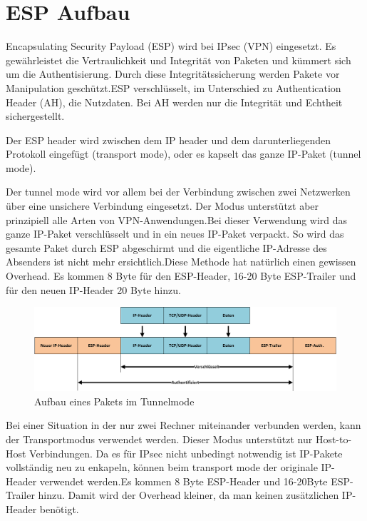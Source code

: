 \section{ESP Aufbau}
\label{sec:ESP Aufbau}

\noindent Encapsulating Security Payload (ESP) wird bei IPsec (VPN) eingesetzt. Es gewährleistet die Vertraulichkeit und Integrität von Paketen und kümmert sich um die Authentisierung. Durch diese Integritätssicherung werden Pakete vor Manipulation geschützt.ESP verschlüsselt, im Unterschied zu Authentication Header (AH), die Nutzdaten. Bei AH werden nur die Integrität und Echtheit sichergestellt.\cite{elektronik_kompendium}

\noindent Der ESP header wird zwischen dem IP header und dem darunterliegenden Protokoll eingefügt (transport mode), oder es kapselt das ganze IP-Paket (tunnel mode).\cite{rfc4303}

\noindent Der tunnel mode wird vor allem bei der Verbindung zwischen zwei Netzwerken über eine unsichere Verbindung eingesetzt. Der Modus unterstützt aber prinzipiell alle Arten von VPN-Anwendungen.Bei dieser Verwendung wird das ganze IP-Paket verschlüsselt und in ein neues IP-Paket verpackt. So wird das gesamte Paket durch ESP abgeschirmt und die eigentliche IP-Adresse des Absenders ist nicht mehr ersichtlich.Diese Methode hat natürlich einen gewissen Overhead. Es kommen 8 Byte für den ESP-Header, 16-20 Byte ESP-Trailer und für den neuen IP-Header 20 Byte hinzu.\cite{elektronik_kompendium}

\begin{figure}[ht]
    \begin{center}
        \includegraphics[trim=1 0 0 0,clip,width=\textwidth]{mainpart/analyse/img/ESP_Tunnelmode.png}
    \end{center}
    \caption{Aufbau eines Pakets im Tunnelmode}
\end{figure}

\noindent Bei einer Situation in der nur zwei Rechner miteinander verbunden werden, kann der Transportmodus verwendet werden. Dieser Modus unterstützt nur Host-to-Host Verbindungen. Da es für IPsec nicht unbedingt notwendig ist IP-Pakete vollständig neu zu enkapeln, können beim transport mode der originale IP-Header verwendet werden.Es kommen 8 Byte ESP-Header und 16-20Byte ESP-Trailer hinzu. Damit wird der Overhead kleiner, da man keinen zusätzlichen IP-Header benötigt.\cite{elektronik_kompendium}

